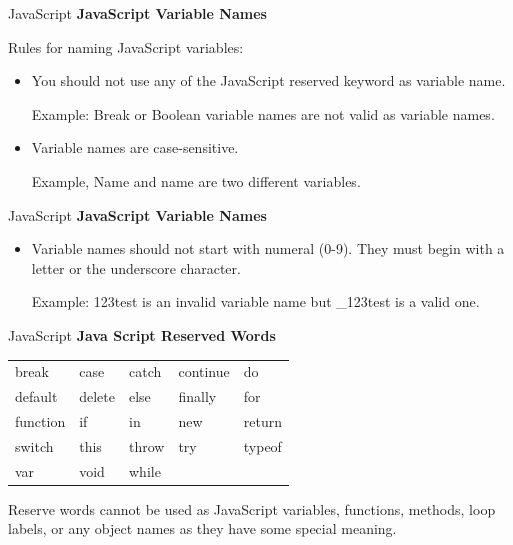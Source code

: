 \documentclass[14pt]{beamer}
\begin{document}
\begin{frame}{JavaScript}
\textbf{JavaScript Variable Names}

\vspace{1pc}
Rules for naming JavaScript variables:
\begin{itemize}
 \item You should not use any of the JavaScript reserved keyword as variable name.
 
 Example: Break or Boolean variable names are not valid as variable names.
 \item Variable names are case-sensitive. 
 
 Example, Name and name are two different variables.
\end{itemize}
\end{frame}

\begin{frame}{JavaScript}
\textbf{JavaScript Variable Names}
\begin{itemize}
 \item Variable names should not start with numeral (0-9). They must begin with a letter or the underscore character.
  
  Example: 123test is an invalid variable name but \_123test is a valid one.
\end{itemize}
\end{frame}

\begin{frame}{JavaScript}
\textbf{Java Script Reserved Words}
\def\arraystretch{1.2}
\begin{center}
\begin{tabular}{l l l l l}
break & case & catch & continue & do \\

default & delete & else & finally & for \\

function & if & in & new & return \\

switch & this & throw & try & typeof \\

var & void & while & & \\

\end{tabular}
\end{center}
Reserve words cannot be used as JavaScript variables, functions, methods, loop labels, or any object names as they have some special meaning.
\end{frame}
\end{document}
